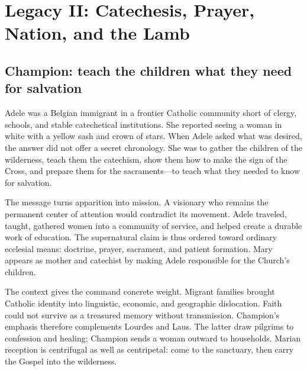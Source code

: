 \section{Legacy II: Catechesis, Prayer, Nation, and the Lamb}

\subsection{Champion: teach the children what they need for salvation}


Adele was a Belgian immigrant in a frontier Catholic community short of clergy, schools, and stable catechetical institutions. She reported seeing a woman in white with a yellow sash and crown of stars. When Adele asked what was desired, the answer did not offer a secret chronology. She was to gather the children of the wilderness, teach them the catechism, show them how to make the sign of the Cross, and prepare them for the sacraments---to teach what they needed to know for salvation.

The message turns apparition into mission. A visionary who remains the permanent center of attention would contradict its movement. Adele traveled, taught, gathered women into a community of service, and helped create a durable work of education. The supernatural claim is thus ordered toward ordinary ecclesial means: doctrine, prayer, sacrament, and patient formation. Mary appears as mother and catechist by making Adele responsible for the Church's children.

The context gives the command concrete weight. Migrant families brought Catholic identity into linguistic, economic, and geographic dislocation. Faith could not survive as a treasured memory without transmission. Champion's emphasis therefore complements Lourdes and Laus. The latter draw pilgrims to confession and healing; Champion sends a woman outward to households. Marian reception is centrifugal as well as centripetal: come to the sanctuary, then carry the Gospel into the wilderness.

